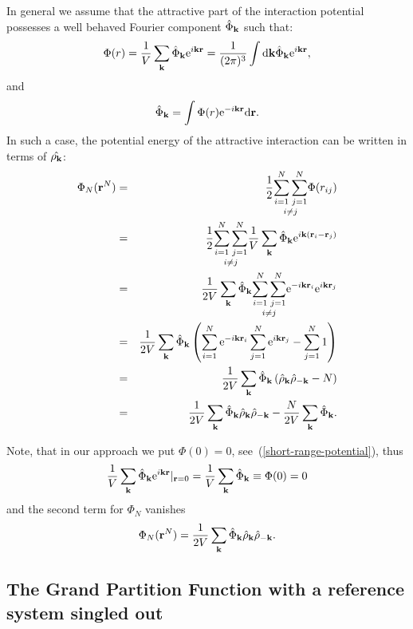 In general we assume that the attractive part of the interaction potential possesses a well behaved Fourier component $\hat{\Phi}_{\vb k}$ such that:
\begin{equation}
	\Phi(r) = \frac{1}{V} \sum_{\vb k} \hat{\Phi}_{\vb k} {\rm e}^{i\vb k \vb r} = \frac{1}{(2\pi)^3} \int {\rm d} {\vb k} \hat{\Phi}_{\vb k} {\rm e}^{i\vb k \vb r},
\end{equation}
and
\begin{equation}
	\hat{\Phi}_{\vb k} = \int \Phi(r) {\rm e}^{-i\vb k \vb r} {\rm d} {\vb r}.
\end{equation}
In such a case, the potential energy of the attractive interaction can be written in terms of $\hat{\rho_{\vb k}}$:
\begin{eqnarray}
	\Phi_N(\vb r^N) &=& \frac12 \underset{i\neq j}{\sum_{i=1}^N \sum_{j=1}^N} \Phi(r_{ij})
	\nonumber\\
	&=& \frac12 \underset{i\neq j}{\sum_{i=1}^N \sum_{j=1}^N} \frac{1}{V} \sum_{\vb k} \hat{\Phi}_{\vb k} {\rm e}^{i\vb k (\vb r_i - \vb r_j)}
	\nonumber\\
	&=& \frac{1}{2V} \sum_{\vb k} \hat{\Phi}_{\vb k} \underset{i\neq j}{\sum_{i=1}^N \sum_{j=1}^N} {\rm e}^{-i\vb k \vb r_i} {\rm e}^{i\vb k\vb r_j}
	\nonumber\\
	&=& \frac{1}{2V} \sum_{\vb k} \hat{\Phi}_{\vb k} 
	\left( \sum_{i=1}^N {\rm e}^{-i\vb k\vb r_i} \sum_{j=1}^N {\rm e}^{i\vb k \vb r_j} - \sum_{j=1}^N 1
	\right)
	\nonumber\\
	&=&\frac{1}{2V} \sum_{\vb k} \hat{\Phi}_{\vb k} \left(\hat{\rho}_{\vb k} \hat{\rho}_{-\vb k} - N\right)
	\nonumber\\
	&=& \frac{1}{2V} \sum_{\vb k} \hat{\Phi}_{\vb k} \hat{\rho}_{\vb k} \hat{\rho}_{-\vb k} - \frac{N}{2V}\sum_{\vb k} \hat{\Phi}_{\vb k}.
\end{eqnarray}

Note, that in our approach we put $\Phi(0) = 0$, see~(\ref{short-range-potential}), thus $$\frac{1}{V}\sum_{\vb k} \hat{\Phi}_{\vb k}{\rm e}^{i\vb k \vb r}|_{\vb r=0} = \frac{1}{V}\sum_{\vb k} \hat{\Phi}_{\vb k} \equiv \Phi(0) = 0$$
and the second term for $\Phi_N$ vanishes
\begin{equation}
	\label{phi_N_via_rho}
	\Phi_N(\vb r^N) = \frac{1}{2V} \sum_{\vb k} \hat{\Phi}_{\vb k} \hat{\rho}_{\vb k} \hat{\rho}_{-\vb k}.
\end{equation}

\subsection{The Grand Partition Function with a reference system singled out}

